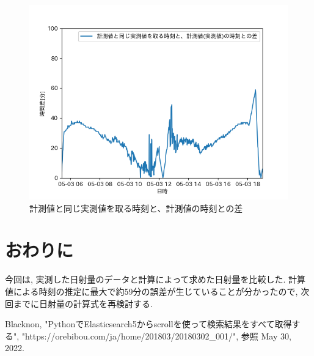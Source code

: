 \documentclass[a4j,12pt,]{jarticle}
\begin{document}
\begin{figure}[H]
  \begin{center}
    \includegraphics[width=160mm]{timeDiff.png}
    \caption{計測値と同じ実測値を取る時刻と、計測値の時刻との差}
    \label{p2}
  \end{center}
\end{figure}

\section{おわりに}
今回は, 実測した日射量のデータと計算によって求めた日射量を比較した.
計算値による時刻の推定に最大で約59分の誤差が生じていることが分かったので, 次回までに日射量の計算式を再検討する.

\begin{thebibliography}{5}
  Blacknon, "PythonでElasticsearch5からscrollを使って検索結果をすべて取得する", "https://orebibou.com/ja/home/201803/20180302\_001/", 参照 May 30, 2022.
\end{thebibliography}
\end{document}
